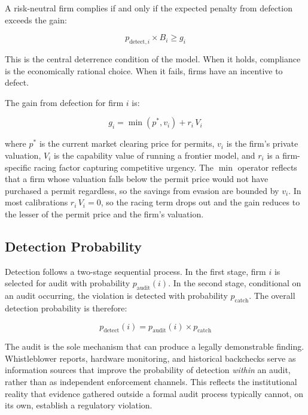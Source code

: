 A risk-neutral firm complies if and only if the expected penalty from defection exceeds the gain:

\begin{equation}
p_{\mathrm{detect},i} \times B_i \geq g_i
\end{equation}

This is the central deterrence condition of the model. When it holds, compliance is the economically rational choice. When it fails, firms have an incentive to defect.

The gain from defection for firm $i$ is:

\begin{equation}
g_i = \min(p^*, v_i) + r_i \, V_i
\end{equation}

where $p^*$ is the current market clearing price for permits, $v_i$ is the firm's private valuation, $V_i$ is the capability value of running a frontier model, and $r_i$ is a firm-specific racing factor capturing competitive urgency. The $\min$ operator reflects that a firm whose valuation falls below the permit price would not have purchased a permit regardless, so the savings from evasion are bounded by $v_i$. In most calibrations $r_i \, V_i = 0$, so the racing term drops out and the gain reduces to the lesser of the permit price and the firm's valuation.

\subsection{Detection Probability}

Detection follows a two-stage sequential process. In the first stage, firm $i$ is selected for audit with probability $p_{\mathrm{audit}}(i)$. In the second stage, conditional on an audit occurring, the violation is detected with probability $p_{\mathrm{catch}}$. The overall detection probability is therefore:

\begin{equation}
p_{\mathrm{detect}}(i) = p_{\mathrm{audit}}(i) \times p_{\mathrm{catch}}
\end{equation}

The audit is the sole mechanism that can produce a legally demonstrable finding. Whistleblower reports, hardware monitoring, and historical backchecks serve as information sources that improve the probability of detection \emph{within} an audit, rather than as independent enforcement channels. This reflects the institutional reality that evidence gathered outside a formal audit process typically cannot, on its own, establish a regulatory violation.

